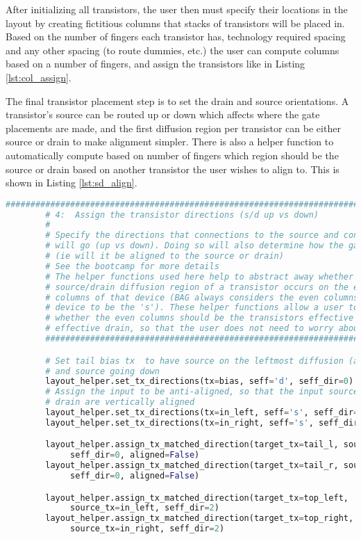 After initializing all transistors, the user then must specify their locations in the layout by creating fictitious columns that stacks of transistors will be placed in. Based on the number of fingers each transistor has, technology required spacing and any other spacing (to route dummies, etc.) the user can compute columns based on a number of fingers, and assign the transistors like in Listing \ref{lst:col_assign}.

The final transistor placement step is to set the drain and source orientations. A transistor's source can be routed up or down which affects where the gate placements are made, and the first diffusion region per transistor can be either source or drain to make alignment simpler. There is also a helper function to automatically compute based on number of fingers which region should be the source or drain based on another transistor the user wishes to align to. This is shown in Listing \ref{lst:sd_align}.
\begin{lstlisting}[language=Python, caption=Determining transistor drain/source configurations, label={lst:sd_align}, float]
	      ################################################################################
        # 4:  Assign the transistor directions (s/d up vs down)
        #
        # Specify the directions that connections to the source and connections to the drain
        # will go (up vs down). Doing so will also determine how the gate is aligned
        # (ie will it be aligned to the source or drain)
        # See the bootcamp for more details
        # The helper functions used here help to abstract away whether the intended 
        # source/drain diffusion region of a transistor occurs on the even or odd
        # columns of that device (BAG always considers the even columns of a 
        # device to be the 's'). These helper functions allow a user to specify 
        # whether the even columns should be the transistors effective source or
        # effective drain, so that the user does not need to worry about BAG's notation.
        ################################################################################

        # Set tail bias tx  to have source on the leftmost diffusion (arbitrary)
        # and source going down
        layout_helper.set_tx_directions(tx=bias, seff='d', seff_dir=0)
        # Assign the input to be anti-aligned, so that the input source and tail
        # drain are vertically aligned
        layout_helper.set_tx_directions(tx=in_left, seff='s', seff_dir=0)
        layout_helper.set_tx_directions(tx=in_right, seff='s', seff_dir=0)

        layout_helper.assign_tx_matched_direction(target_tx=tail_l, source_tx=in_left,
             seff_dir=0, aligned=False)
        layout_helper.assign_tx_matched_direction(target_tx=tail_r, source_tx=in_right,
             seff_dir=0, aligned=False)

        layout_helper.assign_tx_matched_direction(target_tx=top_left, 
             source_tx=in_left, seff_dir=2)
        layout_helper.assign_tx_matched_direction(target_tx=top_right, 
             source_tx=in_right, seff_dir=2)
\end{lstlisting}
